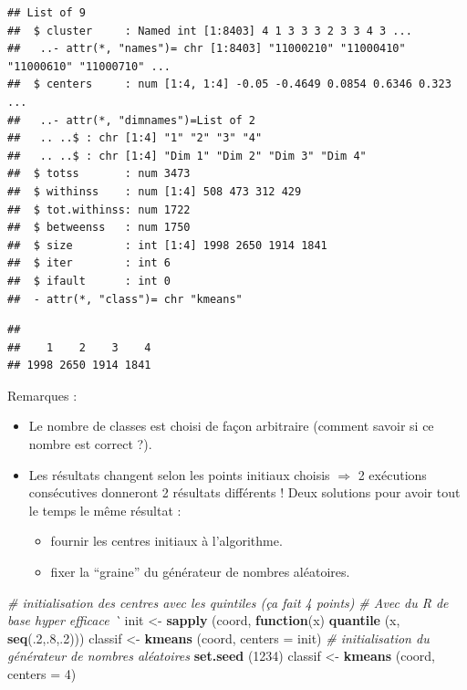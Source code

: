 \documentclass[]{book}
\newenvironment{Shaded}{\begin{snugshade}}{\end{snugshade}}
\newcommand{\CommentTok}[1]{\textcolor[rgb]{0.56,0.35,0.01}{\textit{#1}}}
\newcommand{\ControlFlowTok}[1]{\textcolor[rgb]{0.13,0.29,0.53}{\textbf{#1}}}
\newcommand{\DataTypeTok}[1]{\textcolor[rgb]{0.13,0.29,0.53}{#1}}
\newcommand{\DecValTok}[1]{\textcolor[rgb]{0.00,0.00,0.81}{#1}}
\newcommand{\KeywordTok}[1]{\textcolor[rgb]{0.13,0.29,0.53}{\textbf{#1}}}
\newcommand{\NormalTok}[1]{#1}
\newcommand{\OperatorTok}[1]{\textcolor[rgb]{0.81,0.36,0.00}{\textbf{#1}}}
\newcommand{\StringTok}[1]{\textcolor[rgb]{0.31,0.60,0.02}{#1}}
\providecommand{\tightlist}{%
  \setlength{\itemsep}{0pt}\setlength{\parskip}{0pt}}
\begin{document}
\begin{verbatim}
## List of 9
##  $ cluster     : Named int [1:8403] 4 1 3 3 3 2 3 3 4 3 ...
##   ..- attr(*, "names")= chr [1:8403] "11000210" "11000410" "11000610" "11000710" ...
##  $ centers     : num [1:4, 1:4] -0.05 -0.4649 0.0854 0.6346 0.323 ...
##   ..- attr(*, "dimnames")=List of 2
##   .. ..$ : chr [1:4] "1" "2" "3" "4"
##   .. ..$ : chr [1:4] "Dim 1" "Dim 2" "Dim 3" "Dim 4"
##  $ totss       : num 3473
##  $ withinss    : num [1:4] 508 473 312 429
##  $ tot.withinss: num 1722
##  $ betweenss   : num 1750
##  $ size        : int [1:4] 1998 2650 1914 1841
##  $ iter        : int 6
##  $ ifault      : int 0
##  - attr(*, "class")= chr "kmeans"
\end{verbatim}

\begin{Shaded}
\end{Shaded}

\begin{verbatim}
## 
##    1    2    3    4 
## 1998 2650 1914 1841
\end{verbatim}

Remarques :

\begin{itemize}
\tightlist
\item
  Le nombre de classes est choisi de façon arbitraire (comment savoir si ce nombre est correct ?).
\item
  Les résultats changent selon les points initiaux choisis \(\Rightarrow\) 2 exécutions consécutives donneront 2 résultats différents ! Deux solutions pour avoir tout le temps le même résultat :

  \begin{itemize}
  \tightlist
  \item
    fournir les centres initiaux à l'algorithme.
  \item
    fixer la ``graine'' du générateur de nombres aléatoires.
  \end{itemize}
\end{itemize}

\begin{Shaded}
\begin{Highlighting}[]
\CommentTok{# initialisation des centres avec les quintiles (ça fait 4 points)}
\CommentTok{# Avec du R de base hyper efficace ^^ }
\NormalTok{init <-}\StringTok{ }\KeywordTok{sapply}\NormalTok{ (coord, }\ControlFlowTok{function}\NormalTok{(x) }\KeywordTok{quantile}\NormalTok{ (x, }\KeywordTok{seq}\NormalTok{(.}\DecValTok{2}\NormalTok{,.}\DecValTok{8}\NormalTok{,.}\DecValTok{2}\NormalTok{)))}
\NormalTok{classif <-}\StringTok{ }\KeywordTok{kmeans}\NormalTok{ (coord, }\DataTypeTok{centers =}\NormalTok{ init)}
\CommentTok{# initialisation du générateur de nombres aléatoires}
\KeywordTok{set.seed}\NormalTok{ (}\DecValTok{1234}\NormalTok{)}
\NormalTok{classif <-}\StringTok{ }\KeywordTok{kmeans}\NormalTok{ (coord, }\DataTypeTok{centers =} \DecValTok{4}\NormalTok{)}
\end{Highlighting}
\end{Shaded}
\end{document}
